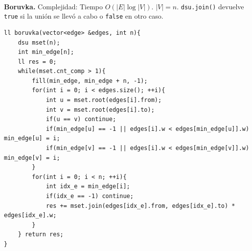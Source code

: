 \documentclass[10pt,spanish,mexico]{article}
\numberwithin{equation}{section}
\newcommand{\pa}[1]{\left( #1 \right)}
\begin{document}
\begin{multicols}{2}
\vspace{-1.2\baselineskip}
\hrulefill\\
\textbf{Boruvka.} Complejidad: Tiempo $O\pa{|E|\log |V|}$. $|V| = n$. \texttt{dsu.join()} devuelve \texttt{true} si la unión se llevó a cabo o \texttt{false} en otro caso.
\begin{verbatim}
ll boruvka(vector<edge> &edges, int n){
    dsu mset(n);
    int min_edge[n];
    ll res = 0;
    while(mset.cnt_comp > 1){
        fill(min_edge, min_edge + n, -1);
        for(int i = 0; i < edges.size(); ++i){
            int u = mset.root(edges[i].from);
            int v = mset.root(edges[i].to);
            if(u == v) continue;
            if(min_edge[u] == -1 || edges[i].w < edges[min_edge[u]].w) min_edge[u] = i;
            if(min_edge[v] == -1 || edges[i].w < edges[min_edge[v]].w) min_edge[v] = i;
        }
        for(int i = 0; i < n; ++i){
            int idx_e = min_edge[i];
            if(idx_e == -1) continue;
            res += mset.join(edges[idx_e].from, edges[idx_e].to) * edges[idx_e].w;
        }
    } return res;
}
\end{verbatim}


\end{multicols}
\end{document}
